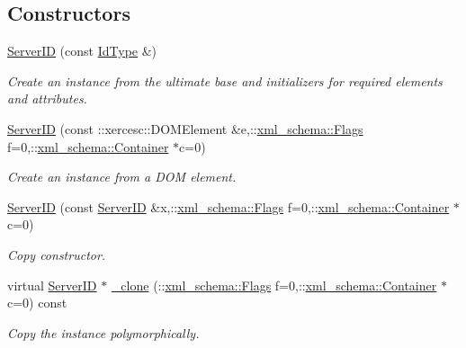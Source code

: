 \subsection*{Constructors}
\begin{DoxyCompactItemize}
\item 
\hypertarget{classopenstack_1_1xml_1_1ServerID_a66943b6721ec8020fef8822158daa445}{
\hyperlink{classopenstack_1_1xml_1_1ServerID_a66943b6721ec8020fef8822158daa445}{ServerID} (const \hyperlink{classopenstack_1_1xml_1_1ServerID_aa988a90cc3ff65df56778e87af119459}{IdType} \&)}
\label{classopenstack_1_1xml_1_1ServerID_a66943b6721ec8020fef8822158daa445}

\begin{DoxyCompactList}\small\item\em Create an instance from the ultimate base and initializers for required elements and attributes. \item\end{DoxyCompactList}\item 
\hyperlink{classopenstack_1_1xml_1_1ServerID_aa066927c5a9b89f7affb079b64872de5}{ServerID} (const ::xercesc::DOMElement \&e,::\hyperlink{namespacexml__schema_affb4c227cbd9aa7453dd1dc5a1401943}{xml\_\-schema::Flags} f=0,::\hyperlink{namespacexml__schema_a333dea2213742aea47a37532dec4ec27}{xml\_\-schema::Container} $\ast$c=0)
\begin{DoxyCompactList}\small\item\em Create an instance from a DOM element. \item\end{DoxyCompactList}\item 
\hyperlink{classopenstack_1_1xml_1_1ServerID_a433f3e39a7c137f70c9946c98728493c}{ServerID} (const \hyperlink{classopenstack_1_1xml_1_1ServerID}{ServerID} \&x,::\hyperlink{namespacexml__schema_affb4c227cbd9aa7453dd1dc5a1401943}{xml\_\-schema::Flags} f=0,::\hyperlink{namespacexml__schema_a333dea2213742aea47a37532dec4ec27}{xml\_\-schema::Container} $\ast$c=0)
\begin{DoxyCompactList}\small\item\em Copy constructor. \item\end{DoxyCompactList}\item 
virtual \hyperlink{classopenstack_1_1xml_1_1ServerID}{ServerID} $\ast$ \hyperlink{classopenstack_1_1xml_1_1ServerID_ada5d8ec939327f90762d336636c36ffc}{\_\-clone} (::\hyperlink{namespacexml__schema_affb4c227cbd9aa7453dd1dc5a1401943}{xml\_\-schema::Flags} f=0,::\hyperlink{namespacexml__schema_a333dea2213742aea47a37532dec4ec27}{xml\_\-schema::Container} $\ast$c=0) const 
\begin{DoxyCompactList}\small\item\em Copy the instance polymorphically. \item\end{DoxyCompactList}\end{DoxyCompactItemize}


